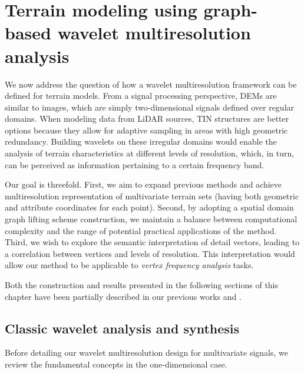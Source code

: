 \documentclass[graybox]{svmult}
\begin{document}
	\section{Terrain modeling using graph-based wavelet multiresolution analysis}
	We now address the question of how a wavelet multiresolution framework can be defined for terrain models. From a signal processing perspective, DEMs are similar to images, which are simply two-dimensional signals defined over regular domains. When modeling data from LiDAR sources, TIN structures are better options because they allow for adaptive sampling in areas with high geometric redundancy. Building wavelets on these irregular domains would enable the analysis of terrain characteristics at different levels of 
	resolution, which, in turn, can be perceived as information pertaining to a certain frequency band.
	
	Our goal is threefold. First, we aim to expand previous methods and achieve multiresolution representation of multivariate terrain sets (having both geometric and attribute coordinates for each point). Second, by adopting a spatial domain graph lifting scheme construction, we maintain a balance between computational complexity and the range of potential practical applications of the method. Third, we wish to explore the semantic interpretation of detail vectors, leading to a correlation between vertices and levels of resolution. This interpretation would allow our method to be applicable to \emph{vertex frequency analysis} tasks.
	
	Both the construction and results presented in the following sections of this chapter have been partially described in our previous works \cite{Cioaca2015} and  \cite{Cioaca2016}.
	
	\subsection{Classic wavelet analysis and synthesis}
	Before detailing our wavelet multiresolution design for multivariate signals, we review the fundamental concepts in the one-dimensional case.
\end{document}
